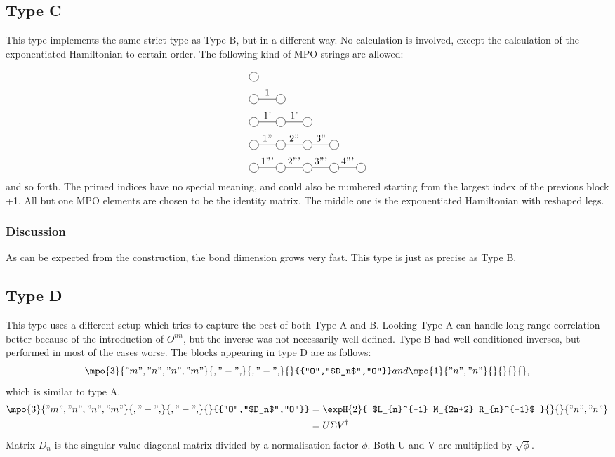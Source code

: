 \subsection{Type C}

This type implements the same strict type as Type B, but in a different way. No calculation is involved, except the calculation of the exponentiated Hamiltonian to certain order. The following kind of MPO strings are allowed:

\begin{equation}
    \begin{split}
        &\mpob{1}{ {,}  }{}{}{}{{,,}} \\
        &\mpob{2}{ {,"1",}  }{}{}{}{{,,}}\\
        &\mpob{3}{ {,"1'","1'",}  }{}{}{}{{,,,}}\\
        &\mpob{4}{ {,"1''","2''","3''",}  }{}{}{}{{,,,,,}}\\
        &\mpob{5}{ {,"1'''","2'''","3'''","4'''",}  }{}{}{}{{,,,,,}}\\
    \end{split}
\end{equation}
and so forth. The primed indices have no special meaning, and could also be numbered starting from the largest index of the previous block +1. All but one MPO elements are chosen to be the identity matrix. The middle one is the exponentiated Hamiltonian with reshaped legs.

\subsubsection{Discussion}
As can be expected from the construction, the bond dimension grows very fast. This type is just as precise as Type B.

\subsection{Type D}

\def \rhs{\expH{2}{ $L_{n}^{-1}  M_{2n+2}  R_{n}^{-1}$ }{}{}{{"n","n"}}  }

This type uses a different setup which tries to capture the best of both Type A and B. Looking Type A can handle long range correlation better because of the introduction of $O^{n n}$, but the inverse was not necessarily well-defined. Type B had well conditioned inverses, but performed in most of the cases worse. The blocks appearing in type D are as follows:
\begin{equation}
    \mpo{3}{{"m","n","n","m"}}{{,"-",}}{{,"-",}}{}{{"O","$D_n$","O"}} and \mpo{1}{{"n","n"}}{}{}{}{} ,
\end{equation}
which is similar to type A.
\begin{equation}
    \begin{split}
        \mpo{3}{{"m","n","n","m"}}{{,"-",}}{{,"-",}}{}{{"O","$D_n$","O"}} &= \rhs \\
        &= U \Sigma V^{ \dagger}
    \end{split}
    \label{eq_nmn_level}
\end{equation}
Matrix $D_n$ is the singular value diagonal matrix divided by a normalisation factor $\phi$. Both U and V are multiplied by $  \sqrt{\phi} $.

